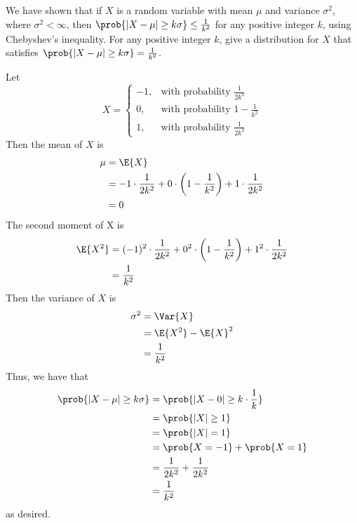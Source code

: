 \documentclass[%
  hwnumber=7,%
  studentnumber=20053722,%
  {name=Bryan Hoang}%
]{%
  mthe353answer%
}
\begin{document}
\begin{questions}
\begin{parts}
      \part{}
      We have shown that if \(X\) is a random variable with mean \(\mu\) and
      variance \(\sigma^2\), where \(\sigma^2 < \infty\), then
      \(\prob{|X-\mu|\ge k\sigma} \le \frac{1}{k^2}\) for any positive integer
      \(k\), using Chebyshev's inequality. For any positive integer \(k\), give
      a distribution for \(X\) that satisfies
      \(\prob{|X-\mu|\ge k\sigma} = \frac{1}{k^2}\).
      \begin{solution}
        Let
        \begin{equation*}
          X = \begin{cases}
            -1, & \text{with probability \(\frac{1}{2k^2}\)}\\
            0, & \text{with probability \(1-\frac{1}{k^2}\)}\\
            1, & \text{with probability \(\frac{1}{2k^2}\)}
          \end{cases}
        \end{equation*}
        Then the mean of \(X\) is
        \begin{align*}
          \mu &= \E{X}\\
          &= -1 \cdot \frac{1}{2k^2} + 0 \cdot \left(1-\frac{1}{k^2}\right) + 1 \cdot \frac{1}{2k^2}\\
          &= 0
        \end{align*}
        The second moment of X is
        \begin{align*}
          \E{X^2} &= (-1)^2 \cdot \frac{1}{2k^2} + 0^2 \cdot
            \left(1-\frac{1}{k^2}\right) + 1^2 \cdot \frac{1}{2k^2}\\
          &= \frac{1}{k^2}
        \end{align*}
        Then the variance of \(X\) is
        \begin{align*}
          \sigma^2 &= \Var{X}\\
          &= \E{X^2} - \E{X}^2\\
          &= \frac{1}{k^2}
        \end{align*}
        Thus, we have that
        \begin{align*}
          \prob{|X-\mu|\ge k\sigma} &= \prob{|X - 0| \ge k \cdot \frac{1}{k}}\\
          &= \prob{|X| \ge 1}\\
          &= \prob{|X| = 1}\\
          &= \prob{X = -1} + \prob{X = 1}\\
          &= \frac{1}{2k^2} + \frac{1}{2k^2}\\
          &= \frac{1}{k^2}
        \end{align*}
        as desired.
      \end{solution}
    \end{parts}
  \end{questions}
\end{document}
